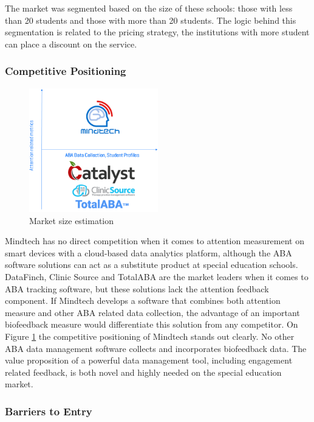 \documentclass[letterpaper,10pt]{article}
\begin{document}
The market was segmented based on the size of these schools: those with less than 20 students and those with more than 20 students. The logic behind this segmentation is related to the pricing strategy, the institutions with more student can place a discount on the service.


\subsubsection{Competitive Positioning}


\begin{figure}
\centering
\includegraphics[width=0.5\textwidth]{newwhitemap.png}
\caption{Market size estimation}
\label{img:newwhitemap}
\end{figure}

Mindtech has no direct competition when it comes to attention measurement on smart devices with a cloud-based data analytics platform, although the ABA software solutions can act as a substitute product at special education schools. DataFinch, Clinic Source and TotalABA are the market leaders when it comes to ABA tracking software, but these solutions lack the attention feedback component. If Mindtech develops a software that combines both attention measure and other ABA related data collection, the advantage of an important biofeedback measure would differentiate this solution from any competitor. On Figure \ref{img:newwhitemap} the competitive positioning of Mindtech stands out clearly. No other ABA data management software collects and incorporates biofeedback data. The value proposition of a powerful data management tool, including engagement related feedback, is both novel and highly needed on the special education market.


\subsubsection{Barriers to Entry} 
\end{document}
